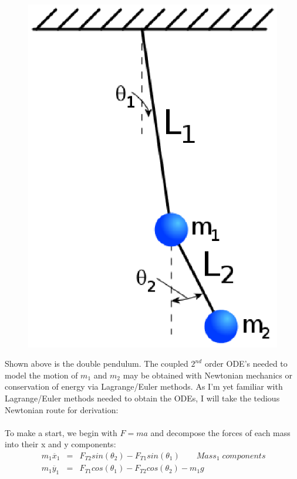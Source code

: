 \documentclass{report}
\begin{document}
\begin{enumerate}
\begin{figure}[H]
\includegraphics[scale=.8]{doublepend.eps}
\label{fatEarth}
\end{figure}
Shown above is the double pendulum. The coupled $2^{nd}$ order ODE's needed to model the motion of $m_1$ and $m_2$ may be obtained with Newtonian mechanics or conservation of energy via Lagrange/Euler methods. As I'm yet familiar with Lagrange/Euler methods needed to obtain the ODEs, I will take the tedious Newtonian route for derivation:
\\
\\To make a start, we begin with $F=ma$ and decompose the forces of each mass into their x and y components:
\\\begin{eqnarray*}
\ m_1\ddot{x_1} &=& F_{T2}sin(\theta_2)-F_{T1}sin(\theta_1) \qquad Mass_1 \; components\\
\ m_1\ddot{y_1} &=& F_{T1}cos(\theta_1)-F_{T2}cos(\theta_2)-m_1g\\

\end{eqnarray*}
\end{enumerate}
\end{document}
